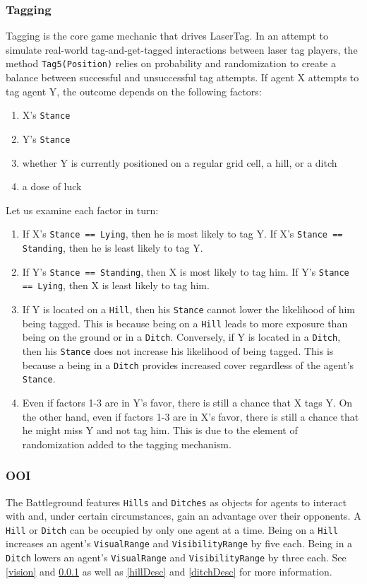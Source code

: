 \documentclass[
    a4paper,
    english,
    DIV=16,
    11pt,
    parskip=half,
    listof=totoc,		%
    index=totoc,		%
    bibliography=totoc,	%
]{scrartcl}
\begin{document}
\subsubsection{Tagging} \label{tagging}
Tagging is the core game mechanic that drives LaserTag. In an attempt to simulate real-world tag-and-get-tagged interactions between laser tag players, the method \texttt{Tag5(Position)} relies on probability and randomization to create a balance between successful and unsuccessful tag attempts. If agent X attempts to tag agent Y, the outcome depends on the following factors:
    \begin{enumerate}
        \item X's \texttt{Stance}
        \item Y's \texttt{Stance}
        \item whether Y is currently positioned on a regular grid cell, a hill, or a ditch
        \item a dose of luck
    \end{enumerate}
    Let us examine each factor in turn:
    \begin{enumerate}
        \item If X's \texttt{Stance == Lying}, then he is most likely to tag Y. If X's \texttt{Stance == Standing}, then he is least likely to tag Y.
        \item If Y's \texttt{Stance == Standing}, then X is most likely to tag him. If Y's \texttt{Stance == Lying}, then X is least likely to tag him.
        \item If Y is located on a \texttt{Hill}, then his \texttt{Stance} cannot lower the likelihood of him being tagged. This is because being on a \texttt{Hill} leads to more exposure than being on the ground or in a \texttt{Ditch}. Conversely, if Y is located in a \texttt{Ditch}, then his \texttt{Stance} does not increase his likelihood of being tagged. This is because a being in a \texttt{Ditch} provides increased cover regardless of the agent's \texttt{Stance}.
        \item Even if factors 1-3 are in Y's favor, there is still a chance that X tags Y. On the other hand, even if factors 1-3 are in X's favor, there is still a chance that he might miss Y and not tag him. This is due to the element of randomization added to the tagging mechanism.
    \end{enumerate}

\subsubsection{OOI} \label{ooi}
The Battleground features \texttt{Hills} and \texttt{Ditches} as objects for agents to interact with and, under certain circumstances, gain an advantage over their opponents. A \texttt{Hill} or \texttt{Ditch} can be occupied by only one agent at a time. Being on a \texttt{Hill} increases an agent's \texttt{VisualRange} and \texttt{VisibilityRange} by five each. Being in a \texttt{Ditch} lowers an agent's \texttt{VisualRange} and  \texttt{VisibilityRange} by three each. See \ref{vision} and \ref{tagging} as well as \ref{hillDesc} and \ref{ditchDesc} for more information.
\end{document}

